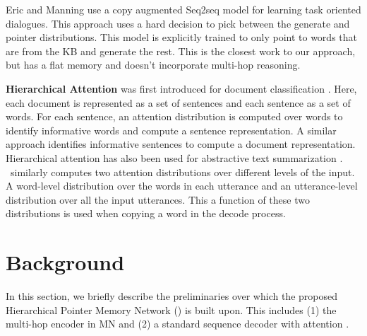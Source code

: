 
Eric and Manning
\cite{eric2017copy} use a copy augmented Seq2seq model for learning task oriented dialogues. This approach uses a hard decision to pick between the generate and pointer distributions. This model is explicitly trained to only point to words that are from the KB and generate the rest. This is the closest work to our approach, but has a flat memory and doesn't incorporate multi-hop reasoning.

\vspace{0.5ex}
\noindent\textbf{Hierarchical Attention} was first introduced for document classification \cite{yang2016hierarchical}. Here, each document is represented as a set of sentences and each sentence as a set of words. For each sentence, an attention distribution is computed over words to identify informative words and compute a sentence representation. A similar approach identifies informative sentences to compute a document representation. Hierarchical attention has also been used for abstractive text summarization \cite{nallapati2016abstractive}.
\sys\ similarly computes two attention distributions over different levels of the input. A word-level distribution over the words in each utterance and an utterance-level distribution over all the input utterances. This a function of these two distributions is used when copying a word in the decode process.

\section{Background}
In this section, we briefly describe the preliminaries over which the proposed Hierarchical Pointer Memory Network (\sys) is built upon. This includes (1) the multi-hop encoder in MN and (2) a standard sequence decoder with attention \cite{bahdanau2014neural}.

